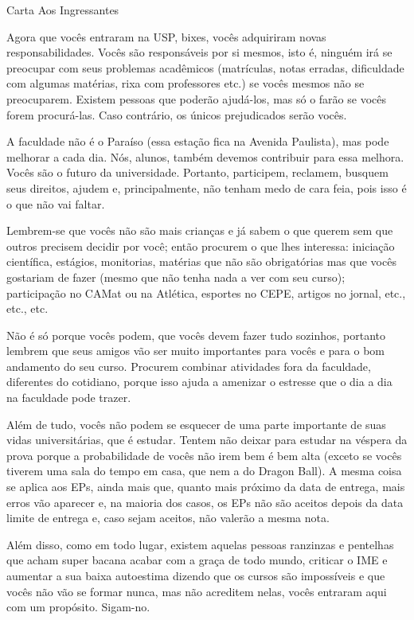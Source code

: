 \begin{editorial}{Carta Aos Ingressantes}

Agora que vocês entraram na USP, bixes, vocês adquiriram novas
responsabilidades.  Vocês são responsáveis por si mesmos, isto é, ninguém irá se
preocupar com seus problemas acadêmicos (matrículas, notas erradas, dificuldade
com algumas matérias, rixa com professores etc.) se vocês mesmos não se
preocuparem. Existem pessoas que poderão ajudá-los, mas só o farão se vocês
forem procurá-las. Caso contrário, os únicos prejudicados serão vocês.

A faculdade não é o Paraíso (essa estação fica na Avenida Paulista), mas pode
melhorar a cada dia. Nós, alunos, também devemos contribuir para essa melhora.
Vocês são o futuro da universidade. Portanto, participem, reclamem, busquem seus
direitos, ajudem e, principalmente, não tenham medo de cara feia, pois isso é o
que não vai faltar.

Lembrem-se que vocês não são mais crianças e já sabem o que querem sem que
outros precisem decidir por você; então procurem o que lhes interessa: iniciação
científica, estágios, monitorias, matérias que não são obrigatórias mas que
vocês gostariam de fazer (mesmo que não tenha nada a ver com seu curso);
participação no CAMat ou na Atlética, esportes no CEPE, artigos no jornal, etc.,
etc., etc.

Não é só porque vocês podem, que vocês devem fazer tudo sozinhos, portanto lembrem que
seus amigos vão ser muito importantes para vocês e para o bom andamento do seu
curso. Procurem combinar atividades fora da faculdade, diferentes do cotidiano,
porque isso ajuda a amenizar o estresse que o dia a dia na faculdade pode
trazer.

Além de tudo, vocês não podem se esquecer de uma parte importante de suas vidas
universitárias, que é estudar. Tentem não deixar para estudar na véspera da
prova porque a probabilidade de vocês não irem bem é bem alta (exceto se vocês
tiverem uma sala do tempo em casa, que nem a do Dragon Ball). A mesma coisa se
aplica aos EPs, ainda mais que, quanto mais próximo da data de entrega, mais
erros vão aparecer e, na maioria dos casos, os EPs não são aceitos depois da
data limite de entrega e, caso sejam aceitos, não valerão a mesma nota.

Além disso, como em todo lugar, existem aquelas pessoas ranzinzas e
pentelhas que acham super bacana acabar com a graça de todo mundo,
criticar o IME e aumentar a sua baixa autoestima dizendo que os cursos
são impossíveis e que vocês não vão se formar nunca, mas não acreditem
nelas, vocês entraram aqui com um propósito. Sigam-no.  


\end{editorial}
